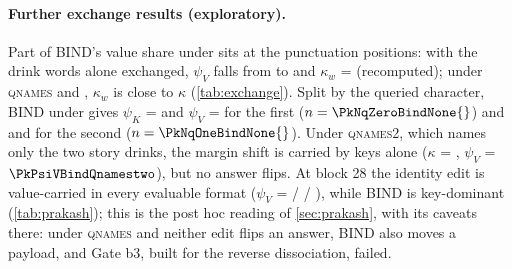 \paragraph{Further exchange results (exploratory).} Part of BIND's value share under \fmtNone{} sits at the punctuation positions: with the drink words alone exchanged, $\psi_V$ falls from \PkPsiVBindNone{} to \PkPsiVwBindNone{} and $\kappa_w$ = \PkKappaWBindNone{} (recomputed); under \textsc{qnames} and \fmtOpt{}, $\kappa_w$ is close to $\kappa$ (\cref{tab:exchange}). Split by the queried character, BIND under \fmtNone{} gives $\psi_K$ = \PkPsiKqZeroBindNone{} and $\psi_V$ = \PkPsiVqZeroBindNone{} for the first ($n = \PkNqZeroBindNone{}$) and \PkPsiKqOneBindNone{} and \PkPsiVqOneBindNone{} for the second ($n = \PkNqOneBindNone{}$). Under \textsc{qnames2}, which names only the two story drinks, the margin shift is carried by keys alone ($\kappa$ = \PkKappaBindQnamestwo{}, $\psi_V$ = $\PkPsiVBindQnamestwo$), but no answer flips. At block 28 the identity edit is value-carried in every evaluable format ($\psi_V$ = \PkPsiVIdTwentyeightNone{} / \PkPsiVIdTwentyeightQnames{} / \PkPsiVIdTwentyeightOpt{}), while BIND is key-dominant (\cref{tab:prakash}); this is the post hoc reading of \cref{sec:prakash}, with its caveats there: under \textsc{qnames} and \fmtOpt{} neither edit flips an answer, BIND also moves a payload, and Gate b3, built for the reverse dissociation, failed.

\begin{table}[!ht]
\centering
\caption{\textbf{Identity key share of the natural clamp on the stories of \citet{prakash2025lookbacks}} (Qwen2.5-14B-Instruct, \PkN{} pairs). $s_{\mathrm{ID}} = \overline{\mathrm{ID}}_K/(\overline{\mathrm{ID}}_K + \overline{\mathrm{ID}}_V)$ for keys and values clamped at the queried drink word from block $\ell_0$ on. The onsets 0, 1, 3, 14 and 29 are preregistered in the four formats; the others form an exploratory sweep in \fmtNone{} and \fmtOpt{}. Under \fmtLetter{} at $\ell_0 = 29$ the denominator is near zero, so $s_{\mathrm{ID}}$ is undetermined (CI in \cref{tab:prakash}).}
\label{tab:clamp}
\resizebox{\textwidth}{!}{}
\end{table}

